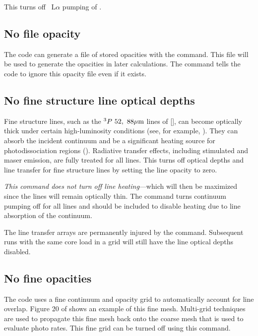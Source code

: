 This turns off \hi\ L$\alpha $ pumping of \feii.

\subsection{No file opacity}

The code can generate a file of stored opacities with the
 command.
This file will be used to generate the opacities in later
calculations.
The  command tells the code to ignore this
opacity file even if it exists.

\subsection{No fine structure line optical depths}

Fine structure lines, such as the $^3P\ 52,\ 88 \micron$ lines of [\oiii],
can become optically thick under certain high-luminosity conditions
(see, for example, \citealp{Rubin1983}).
They can absorb the incident continuum and be a significant
heating source for photodissociation regions
(\citealp{Tielens1985a}).
Radiative transfer effects, including stimulated and maser emission, are
fully treated for all lines.
This turns off optical depths and line transfer
for fine structure lines by setting the line opacity to zero.

\emph{This command does not turn off line heating}---which
will then be maximized
since the lines will remain optically thin.
The  command
turns continuum pumping off for all lines
and should be included to disable heating due to line absorption of the
continuum.

The line transfer arrays are permanently injured by the
 command.
Subsequent runs with the same core load in a grid will still have
the line optical depths disabled.

\subsection{No fine opacities}

The code uses a fine continuum and opacity grid to automatically account
for line overlap.
Figure 20 of \citet{Shaw2005} shows an example of this
fine mesh.
Multi-grid techniques are used to propagate this fine mesh back
onto the coarse mesh that is used to evaluate photo rates.
This fine grid
can be turned off using this command.

